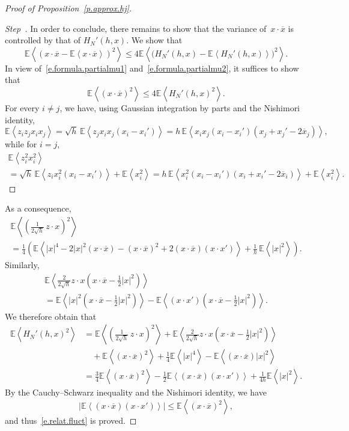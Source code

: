 \documentclass[AHL,Unicode,longabstracts,published]{cedram}
\newcommand{\E}{\mathbb{E}}
\newcommand{\1}{\mathds{1}}
\renewcommand{\le}{\leqslant}
\newcommand{\la}{\left\langle}
\newcommand{\ra}{\right\rangle}
\renewcommand{\bar}{\overline}
\newcounter{stepcount}
\newenvironment{step}{\refstepcounter{stepcount}\begin{proof}[Step~\thestepcount]}{\let\qed\relax\end{proof}}
\begin{document}
\begin{proof}[Proof of Proposition~\ref{p.approx.hj}]

\begin{step}\label{st3}
In order to conclude, there remains to show that the variance of~$x \cdot \bar x$ is controlled by that of $H_N'(h,x)$. We show that
\begin{equation}\label{e.relat.fluct}
\E \la \left(x\cdot \bar x - \E\la x\cdot \bar x \ra \right)^2 \ra \le 4 \E \la \big(H_N'(h,x) - \E \la H_N'(h,x) \ra \big) ^2 \ra.
\end{equation}
In view of~\eqref{e.formula.partialmu1} and~\eqref{e.formula.partialmu2}, it suffices to show that
\[
\E \la \left(x\cdot \bar x \right)^2 \ra \le 4 \E \la H_N'(h,x) ^2 \ra.
\]
For every $i \neq j$, we have, using Gaussian integration by parts and the Nishimori identity,
\[
\E \la z_i z_j x_i x_j \ra = \sqrt{h} \, \E \la z_j x_i x_j(x_i - x_i')\ra = h \, \E \la x_i x_j\left(x_i - x_i'\right)\left(x_j + x_j' -2 \bar x_j\right) \ra,
\]
while for $i = j$,
\begin{multline*}
\E \la z_i^2 x_i^2\ra\\
= \sqrt{h} \, \E \la z_i x_i^2(x_i - x_i') \ra + \E\la x_i^2 \ra = h \, \E \la x_i^2(x_i - x_i') (x_i + x_i' - 2 \bar x_i) \ra + \E \la x_i^2 \ra.
\end{multline*}
\end{step}
As a consequence,
\begin{multline*}
\E \la \left(\frac 1 {2\sqrt{h}} \, z \cdot x \right) ^2 \ra
\\
= \frac 1 4 \left(\E \la |x|^4 - 2 |x|^2(x\cdot \bar x) - (x\cdot \bar x)^2 + 2 (x\cdot \bar x)(x \cdot x')\ra+ \frac{1}{{h}} \, \E \la |x|^2 \ra\right).
\end{multline*}
Similarly,
\begin{multline*}
\E \la \frac{2}{2\sqrt{h}} z\cdot x \left(x \cdot \bar x - \frac 1 2 |x|^2 \right) \ra
\\
= \E \la |x|^2 \left(x \cdot \bar x - \frac 1 2 |x|^2 \right) \ra - \E \la (x\cdot x') \left(x \cdot \bar x - \frac 1 2 |x|^2 \right) \ra.
\end{multline*}
We therefore obtain that
\begin{align*}
\E \la H_N'(h,x)^2 \ra &=
\E \la \left(\frac 1 {2\sqrt{h}} \, z \cdot x \right) ^2 \ra +
\E \la \frac{2}{2\sqrt{h}} z\cdot x \left(x \cdot \bar x - \frac 1 2 |x|^2 \right) \ra
\\
&\quad +\E \la (x \cdot \bar x)^2 \ra + \frac 1 4 \E \la |x|^4 \ra - \E \la (x\cdot \bar x)|x|^2 \ra
\\
 &= \frac 3 4 \E \la (x\cdot \bar x)^2 \ra - \frac 1 2 \E \la (x \cdot \bar x)(x \cdot x') \ra + \frac 1 {4{h}} \E \la |x|^2 \ra.
\end{align*}
By the Cauchy--Schwarz inequality and the Nishimori identity, we have
\[
\left| \E \la (x \cdot \bar x)(x \cdot x') \ra \right| \le \E \la (x\cdot \bar x)^2 \ra,
\]
and thus~\eqref{e.relat.fluct} is proved.
\end{proof}
\end{document}
